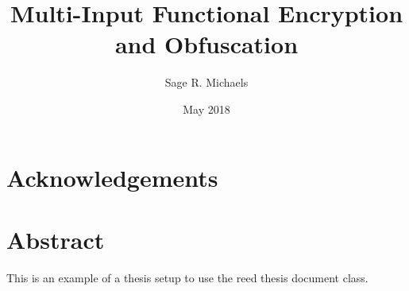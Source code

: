 \documentclass[12pt,twoside]{reedthesis}
\title{Multi-Input Functional Encryption and Obfuscation}
\author{Sage R. Michaels}
\date{May 2018}
\begin{document}
  \maketitle
  \frontmatter %
  \pagestyle{empty} %

    \chapter*{Acknowledgements}
	
		
	

    \chapter*{Abstract}
	This is an example of a thesis setup to use the reed thesis document class.
	

    \tableofcontents
    
 
  \mainmatter %
  \pagestyle{fancyplain} %
    
\end{document}

